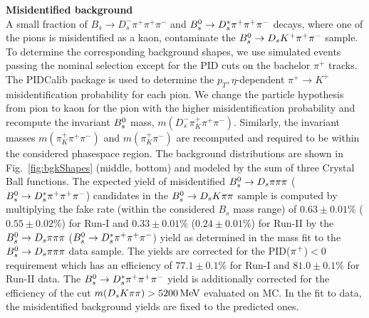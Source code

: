 \noindent\textbf{Misidentified background}  \\
A small fraction of $B_s \to D_s^- \pi^+ \pi^+ \pi^-$ and ${{B}^0_{s}}\rightarrow D_s^{*}\pi^+ \pi^+ \pi^-$ decays, where one of the pions is misidentified as a kaon, contaminate the 
${{B}^0_{s}}\rightarrow D_s K^+ \pi^+ \pi^-$ sample.
To determine the corresponding background shapes, we use simulated events passing the nominal selection
except for the PID cuts on the bachelor $\pi^+$ tracks. 
The \textsf{PIDCalib} package is used to determine the $p_T,\eta$-dependent $\pi^+\rightarrow K^+$ misidentification probability for each pion. 
We change the particle hypothesis from pion to kaon for the pion with the higher misidentification probability and recompute the invariant ${{B}^0_{s}}$ mass, $m(D_s^- \pi^+_K \pi^+ \pi^- )$. 
Similarly, the invariant masses $m(\pi^+_K \pi^+ \pi^- )$ and $m(\pi^+_K \pi^-)$ are recomputed and required to be within the considered phasespace region.
The background distributions are shown in Fig.~\ref{fig:bgkShapes} (middle, bottom) and modeled by the sum of three Crystal Ball functions. 
\newpage
The expected yield of misidentified ${{B}^0_{s}}\rightarrow{\ensuremath{{D}_{s}}}{\ensuremath{\pi}}{\ensuremath{\pi}}{\ensuremath{\pi}}$ (${{B}^0_{s}}\rightarrow D_s^{*}\pi^+ \pi^+ \pi^-$) candidates in the ${{B}^0_{s}}\rightarrow{\ensuremath{{D}_{s}}} K{\pi}{\pi}$ sample is computed 
by multiplying the fake rate (within the considered $B_s$ mass range) of $0.63 \pm 0.01\%$ ($0.55 \pm 0.02\%$) 
for Run-I 
and $0.33 \pm 0.01\%$ ($0.24 \pm 0.01\%$) 
for Run-II
by the ${{B}^0_{s}}\rightarrow{\ensuremath{{D}_{s}}}{\ensuremath{\pi}}{\ensuremath{\pi}}{\ensuremath{\pi}}$ (${{B}^0_{s}}\rightarrow D_s^{*}\pi^+ \pi^+ \pi^-$) yield as determined in the mass fit to the ${{B}^0_{s}}\rightarrow{\ensuremath{{D}_{s}}}{\ensuremath{\pi}}{\ensuremath{\pi}}{\ensuremath{\pi}}$ data sample.
The yields are corrected for the PID(${{\pi}^+}$)$<0$ requirement which has an efficiency of $77.1 \pm 0.1 \%$ for Run-I and $81.0 \pm 0.1 \%$ for Run-II data.  
The ${{B}^0_{s}}\rightarrow D_s^{*}\pi^+ \pi^+ \pi^-$ yield is additionally corrected for the efficiency of the cut $m({{D}_{s}} K{\pi}{\pi})>5200\mathrm{\,Me\kern -0.1em V}$ evaluated on MC.
In the fit to data, the misidentified background yields are fixed to the predicted ones.

